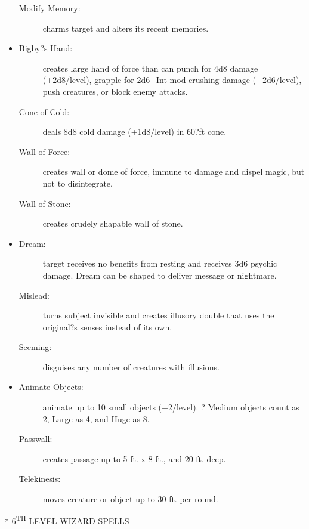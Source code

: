\documentclass[DIV=14, paper=a4, fontsize=10pt, twocolumn, twoside]{scrartcl}
\makeatletter
\let\origsection\section
\renewcommand\section{\@ifstar{\starsection}{\nostarsection}}
\newcommand\nostarsection[1]
{\origsection{#1}\vspace{-0.5em}}
\newcommand\starsection[1]
{\vspace{-0.5cm}\origsection*{#1}\vspace{-0.3cm}}
\newcommand\invisiblesection[1]{%
  \refstepcounter{section}%
  \sectionmark{#1}
}
\newcommand\listsection[2]{%
	\invisiblesection{#2}
	\section*{\color{dndblue} #1}
}
\renewcommand\thesection{}
\makeatother
\begin{document}
\begin{itemize}[align=parleft,labelwidth=1cm]
\begin{description}
 \item[Modify Memory:] charms target and alters its recent memories.
\end{description}
\renewcommand{\labelitemi}{Evoc}\item
\begin{description}
 \item[Bigby?s Hand:] creates large hand of force than can punch for 4d8 damage (+2d8/level), grapple for 2d6+Int mod crushing damage (+2d6/level), push creatures, or block enemy attacks.
 \item[Cone of Cold:] deals 8d8 cold damage (+1d8/level) in 60?ft cone.
 \item[Wall of Force:] creates wall or dome of force, immune to damage and dispel magic, but not to disintegrate.
 \item[Wall of Stone:] creates crudely shapable wall of stone.
\end{description}
\renewcommand{\labelitemi}{Illus}\item
\begin{description}
 \item[Dream:] target receives no benefits from resting and receives 3d6 psychic damage. Dream can be shaped to deliver message or nightmare.
 \item[Mislead:] turns subject invisible and creates illusory double that uses the original?s senses instead of its own.
 \item[Seeming:] disguises any number of creatures with illusions.
\end{description}
\renewcommand{\labelitemi}{Trans}\item
\begin{description}
 \item[Animate Objects:] animate up to 10 small objects (+2/level). ? Medium objects count as 2, Large as 4, and Huge as 8.
 \item[Passwall:] creates passage up to 5 ft. x 8 ft., and 20 ft. deep.
 \item[Telekinesis:] moves creature or object up to 30 ft. per round.
\end{description}
\end{itemize}

\listsection{\color{dndblue}6\textsuperscript{TH}-LEVEL WIZARD SPELLS}{LEVEL 6}
\end{document}
